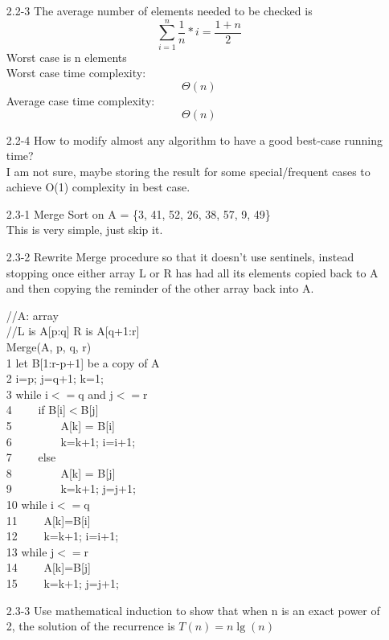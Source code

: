 \documentclass[]{article}
\begin{document}
\begin{enumerate}
\item[2.2-3] The average number of elements needed to be checked is $$ \sum_{i=1}^{n}\frac{1}{n} * i = \frac{1+n}{2} $$
Worst case is n elements\\
Worst case time complexity: $$ \Theta(n) $$
Average case time complexity: $$ \Theta(n) $$

\item[2.2-4]
How to modify almost any algorithm to have a good best-case running time?\\
I am not sure, maybe storing the result for some special/frequent cases to achieve O(1) complexity in best case.

\item[2.3-1]Merge Sort on A = \{3, 41, 52, 26, 38, 57, 9, 49\}\\
This is very simple, just skip it.

\item[2.3-2] Rewrite Merge procedure so that it doesn't use sentinels, instead stopping once either array L or R has had all its elements copied back to A and then copying the reminder of the other array back into A.

//A: array\\
//L is A[p:q] R is A[q+1:r]\\
Merge(A, p, q, r)\\
1 let B[1:r-p+1] be a copy of A\\
2 i=p; j=q+1; k=1;\\
3 while i$<=$q and j$<=$r\\
4 \ \ \ \ if B[i]$<$B[j]\\
5 \ \ \ \ \ \ \ \ A[k] = B[i]\\
6 \ \ \ \ \ \ \ \ k=k+1; i=i+1;\\
7 \ \ \ \ else\\
8 \ \ \ \ \ \ \ \ A[k] = B[j]\\
9 \ \ \ \ \ \ \ \ k=k+1; j=j+1;\\
10 while i$<=$q\\
11 \ \ \ \ A[k]=B[i]\\
12 \ \ \ \ k=k+1; i=i+1;\\
13 while j$<=$r\\
14 \ \ \ \ A[k]=B[j]\\
15 \ \ \ \ k=k+1; j=j+1;\\

\item[2.3-3] Use mathematical induction to show that when n is an exact power of 2, the solution of the recurrence is $T(n) = n\lg(n)$


\end{enumerate}
\end{document}
